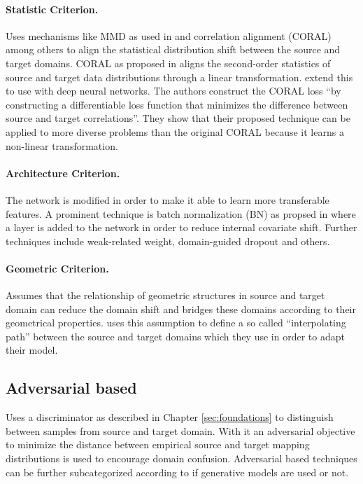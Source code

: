 \paragraph{Statistic Criterion.}
Uses mechanisms like MMD as used in \cite{DBLP:journals/corr/ZhangYCW15} and correlation alignment (CORAL) among others to align the statistical distribution shift between the source and target domains. CORAL as proposed in \cite{DBLP:journals/corr/SunFS15} aligns the second-order statistics of source and target data distributions through a linear transformation. \cite{DBLP:journals/corr/SunS16a} extend this to use with deep neural networks. The authors construct the CORAL loss ``by constructing a differentiable loss function that minimizes the difference between source and target correlations''. They show that their proposed technique can be applied to more diverse problems than the original CORAL because it learns a non-linear transformation.

\paragraph{Architecture Criterion.}
The network is modified in order to make it able to learn more transferable features. A prominent technique is batch normalization (BN) as propsed in \cite{DBLP:journals/corr/IoffeS15} where a layer is added to the network in order to reduce internal covariate shift.  Further techniques include weak-related weight, domain-guided dropout and others. %

\paragraph{Geometric Criterion.}
Assumes that the relationship of geometric structures in source and target domain can reduce the domain shift and bridges these domains according to their geometrical properties. \cite{Chopra2013DLIDDL} uses this assumption to define a so called ``interpolating path'' between the source and target domains which they use in order to adapt their model.

\subsection{Adversarial based}
Uses a discriminator as described in Chapter \ref{sec:foundations} to distinguish between samples from source and target domain. With it an adversarial objective to minimize the distance between empirical source and target mapping distributions is used to encourage domain confusion. Adversarial based techniques can be further subcategorized according to if generative models are used or not.

